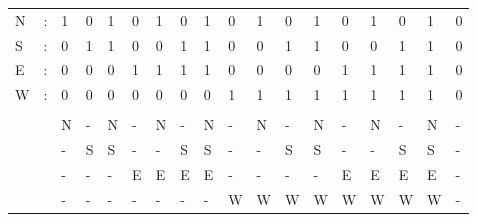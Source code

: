 \begin{table}[]
\begin{tabular}{llllllllllllllllll}
N & : & 1 & 0 & 1 & 0 & 1 & 0 & 1 & 0 & 1 & 0 & 1 & 0 & 1 & 0 & 1 & 0 \\
S & : & 0 & 1 & 1 & 0 & 0 & 1 & 1 & 0 & 0 & 1 & 1 & 0 & 0 & 1 & 1 & 0 \\
E & : & 0 & 0 & 0 & 1 & 1 & 1 & 1 & 0 & 0 & 0 & 0 & 1 & 1 & 1 & 1 & 0 \\
W & : & 0 & 0 & 0 & 0 & 0 & 0 & 0 & 1 & 1 & 1 & 1 & 1 & 1 & 1 & 1 & 0 \\
  &   &   &   &   &   &   &   &   &   &   &   &   &   &   &   &   &   \\
  &   & N & - & N & - & N & - & N & - & N & - & N & - & N & - & N & - \\
  &   & - & S & S & - & - & S & S & - & - & S & S & - & - & S & S & - \\
  &   & - & - & - & E & E & E & E & - & - & - & - & E & E & E & E & - \\
  &   & - & - & - & - & - & - & - & W & W & W & W & W & W & W & W & -
\end{tabular}
\end{table}